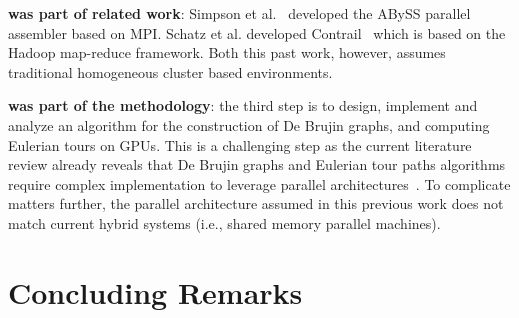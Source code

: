 \documentclass{acm_proc_article-sp}[12pt]
\begin{document}
\textbf{was part of related work}: Simpson et al.~\cite{simpson2009abyss} developed the ABySS parallel assembler based on MPI. Schatz et al. developed Contrail~\cite{schatz2010high} which is based on the Hadoop map-reduce framework. Both this past work, however, assumes traditional homogeneous cluster based environments.

\textbf{was part of the methodology}: the third step is to design, implement and analyze an algorithm for the construction of De Brujin graphs, and computing Eulerian tours on GPUs. This is a challenging step as the current literature review already reveals that De Brujin graphs and Eulerian tour paths algorithms require complex implementation to leverage parallel architectures~\cite{Quinn1984,Atallah1984}. To complicate matters further, the parallel architecture assumed in this previous work does not match current hybrid systems (i.e., shared memory parallel machines).

\section{Concluding Remarks}
\label{sec:conclusion}



\end{document}
